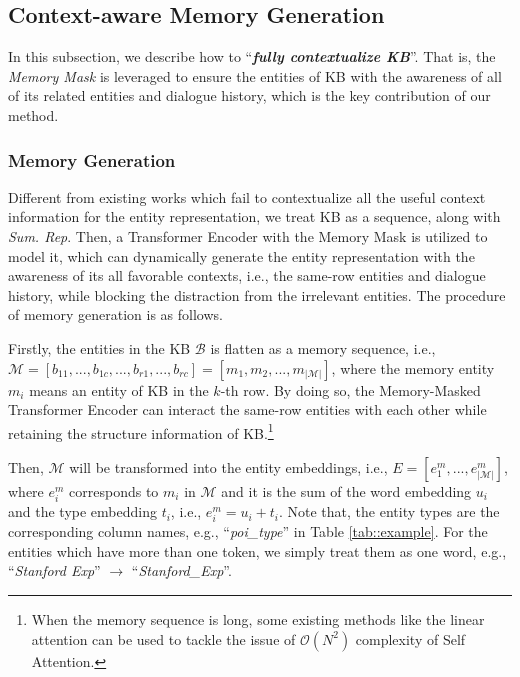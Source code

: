 \documentclass[11pt]{article}
\begin{document}
\subsection{Context-aware Memory Generation}
\label{ssec:memory}

In this subsection, we describe how to ``\textbf{\textit{fully contextualize KB}}”. That is, the  \textit{Memory Mask} is leveraged to ensure the entities of KB with the awareness of all of its related entities and dialogue history, which is the key contribution of our method.

\subsubsection{Memory Generation}
\label{sssec::rep_gen}

Different from existing works which fail to contextualize all the useful context information for the entity representation, we treat KB as a sequence, along with \textit{Sum. Rep}. Then, a Transformer Encoder with the Memory Mask is utilized to model it, which can dynamically generate the entity representation with the awareness of its all favorable contexts, i.e., the same-row entities and dialogue history, while blocking the distraction from the irrelevant entities. The procedure of memory generation is as follows.

Firstly, the entities in the KB $\mathcal{B}$ is flatten as a memory sequence, i.e., $\mathcal{M} = [b_{11}, ..., b_{1c}, ..., b_{r1}, ..., b_{rc}] = [m_1, m_2, ..., m_{|\mathcal{M}|}]$, where the memory entity $m_i$ means an entity of KB in the $k$-th row. By doing so, the Memory-Masked Transformer Encoder can interact the same-row entities with each other while retaining the structure information of KB.\footnote{When the memory sequence is long, some existing methods like the linear attention \cite{kitaev2020reformer} can be used to tackle the issue of $\mathcal{O}(N^2)$ complexity of Self Attention.}

Then, $\mathcal{M}$ will be transformed into the entity embeddings, i.e., $E = [e_1^m, ..., e_{|\mathcal{M}|}^m]$, where $e_i^m$ corresponds to $m_i$ in $\mathcal{M}$ and it is the sum of the word embedding $u_i$ and the type embedding $t_i$, i.e., $e_i^m = u_i + t_i$. Note that, the entity types are the corresponding column names, e.g., ``\textit{poi\_type}'' in Table \ref{tab::example}. For the entities which have more than one token, we simply treat them as one word, e.g., ``\textit{Stanford Exp}'' $\rightarrow$ ``\textit{Stanford\_Exp}''.
\end{document}
